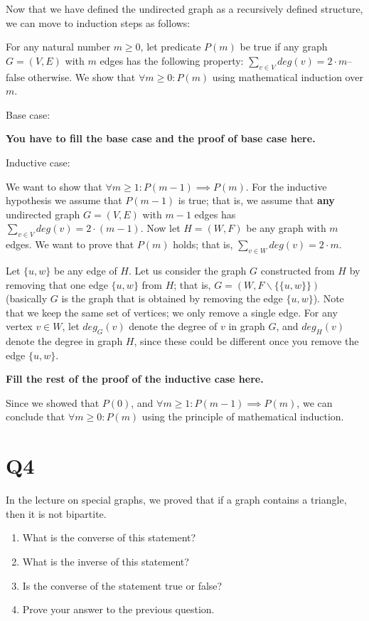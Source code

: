 \documentclass[12pt]{exam}
\begin{document}
Now that we have defined the undirected graph as a recursively defined structure, we can move to induction steps as follows:

For any natural number $m \geq 0$, let predicate $P(m)$ be true if any graph $G=(V,E)$ with $m$ edges has the following property: $\sum_{v \in V} deg(v) = 2\cdot m$-- false otherwise. We show that $\forall m \geq 0: P(m)$ using mathematical induction over $m$.

Base case: 

\textbf{You have to fill the base case and the proof of base case here.}

Inductive case:

We want to show that $\forall m \geq 1: P(m-1) \implies P(m)$. For the inductive hypothesis we assume that $P(m-1)$ is true; that is, we assume that \textbf{any} undirected graph $G=(V,E)$ with $m-1$ edges has $\sum_{v \in V} deg(v) = 2\cdot (m-1)$. Now let $H=(W, F)$ be any graph with $m$ edges. We want to prove that $P(m)$ holds; that is, $\sum_{v \in W} deg(v) = 2\cdot m$.

Let $\{u, w\}$ be any edge of $H$. Let us consider the graph $G$ constructed from $H$ by removing that one edge $\{u, w\}$ from $H$; that is, $G=(W, F \backslash \{\{u, w\}\})$ (basically $G$ is the graph that is obtained by removing the edge $\{u, w\}$). Note that we keep the same set of vertices; we only remove a single edge. For any vertex $v\in W$, let $deg_G(v)$ denote the degree of $v$ in graph $G$, and $deg_H(v)$ denote the degree in graph $H$, since these could be different once you remove the edge $\{u,w\}$.

\textbf{Fill the rest of the proof of the inductive case here.}

Since we showed that $P(0)$, and $\forall m \geq 1: P(m-1) \implies P(m)$, we can conclude that $\forall m \geq 0: P(m)$ using the principle of mathematical induction.

\section{Q4}
In the lecture on special graphs, we proved that if a graph contains a triangle, then it is not bipartite.
\begin{enumerate}
    \item What is the converse of this statement?
    \item What is the inverse of this statement?
    \item Is the converse of the statement true or false?
    \item Prove your answer to the previous question.
\end{enumerate}
\end{document}
